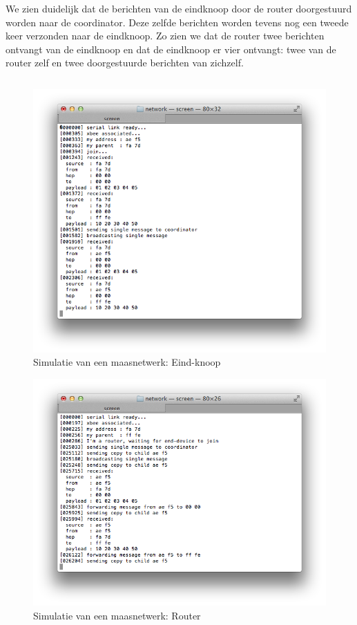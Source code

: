 We zien duidelijk dat de berichten van de eindknoop door de router doorgestuurd
worden naar de coordinator. Deze zelfde berichten worden tevens nog een tweede
keer verzonden naar de eindknoop. Zo zien we dat de router twee berichten
ontvangt van de eindknoop en dat de eindknoop er vier ontvangt: twee van de
router zelf en twee doorgestuurde berichten van zichzelf.

\inputminted[linenos,frame=lines,framesep=2mm,fontsize=\footnotesize,firstline=37,lastline=60,firstnumber=37]{c}{../src/demo/lib/network.c}
\vspace{-5mm}
\vspace{3mm}

\begin{figure}[ht]
  \centering
  \includegraphics[width=.9\linewidth]{../src/demo/network/end-device.png}
  \caption{Simulatie van een maasnetwerk: Eind-knoop}
  \label{fig:virtual-mesh-end-device}
\end{figure}

\begin{figure}[ht]
  \centering
  \includegraphics[width=.9\linewidth]{../src/demo/network/router.png}
  \caption{Simulatie van een maasnetwerk: Router}
  \label{fig:virtual-mesh-router}
\end{figure}

